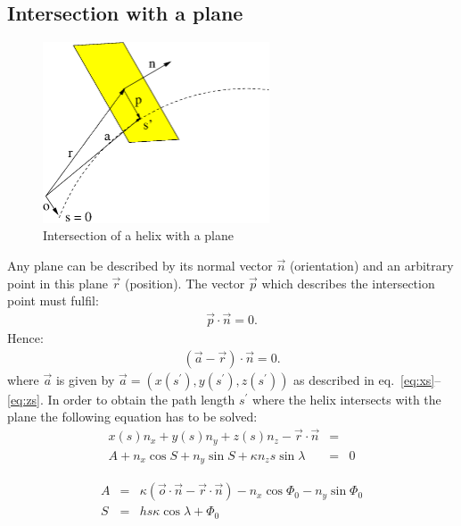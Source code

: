 \documentclass[twoside]{article}
\begin{document}
\begin{description}
\subsection{Intersection with a plane}

\begin{figure}[thb]
    \begin{center}
        \includegraphics[width=0.6\textwidth]{helix3.eps}
        \caption{Intersection of a helix with a plane}
        \label{fig:plane}
    \end{center}
\end{figure}

Any plane can be described by its normal vector $\vec{n}$
(orientation) and an arbitrary point in this plane $\vec{r}$ (position). The vector
$\vec{p}$ which describes the intersection point must fulfil:
\begin{eqnarray}
    \vec{p} \cdot \vec{n} = 0.
\end{eqnarray}
Hence:
\begin{eqnarray}
    (\vec{a}-\vec{r}) \cdot \vec{n} = 0. \label{eq:ansatz}
\end{eqnarray}
where $\vec{a}$ is given by $\vec{a} = (x(s^{\prime}),
y(s^{\prime}), z(s^{\prime}))$ as described in
eq.~\ref{eq:xs}--\ref{eq:zs}.  In order to obtain the path length
$s^{\prime}$ where the helix intersects with the plane the
following equation has to be solved:
\begin{eqnarray}
    x(s) n_x + y(s) n_y + z(s) n_z - \vec{r} \cdot \vec{n} &=& \\
    A + n_x \cos S
    + n_y \sin S
    + \kappa n_z s \sin \lambda &=& 0 \label{eq:inter}
\end{eqnarray}

\begin{eqnarray}
    A &=& \kappa (\vec{o} \cdot \vec{n} - \vec{r} \cdot \vec{n}) - n_x \cos \Phi_0 - n_y \sin \Phi_0 \\
    S &=& h s \kappa \cos \lambda + \Phi_0  
\end{eqnarray}


\end{description}
\end{document}
